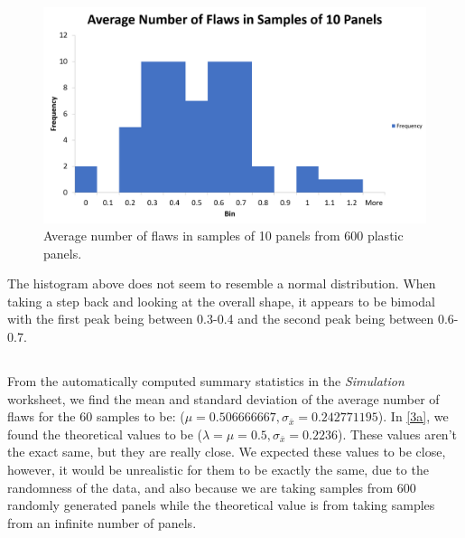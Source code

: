 \documentclass[letterpaper]{article}
\begin{document}
\begin{figure}[H]
 \centering
 \includegraphics[width=\textwidth]{q4.png}
 \caption{Average number of flaws in samples of 10 panels from 600 plastic panels.}
 \label{4c}
\end{figure}

The histogram above does not seem to resemble a normal distribution. When taking
a step back and looking at the overall shape, it appears to be bimodal with the
first peak being between 0.3-0.4 and the second peak being between 0.6-0.7.

\subsection{}%
From the automatically computed summary statistics in the \textit{Simulation}
worksheet, we find the mean and standard deviation of the average number of
flaws for the 60 samples to be: ($\mu=0.506666667,
 \sigma_{\bar{x}}=0.242771195$). In \ref{3a}, we found the theoretical values to
be ($\lambda=\mu=0.5, \sigma_{\bar{x}}=0.2236$). These values aren't the exact
same, but they are really close. We expected these values to be close, however,
it would be unrealistic for them to be exactly the same, due to the randomness
of the data, and also because we are taking samples from 600 randomly generated
panels while the theoretical value is from taking samples from an infinite
number of panels.

\section{}%

\subsection{}%
\end{document}
